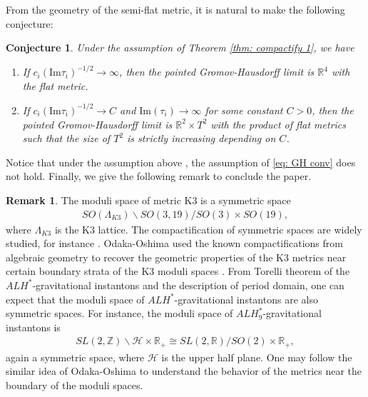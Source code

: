 \documentclass[11pt]{amsart}
\theoremstyle{plain}
\newtheorem{cor}[thm]{Corollary}
\newtheorem{conj}[thm]{Conjecture}
\theoremstyle{definition}
\newtheorem{rk}[thm]{Remark}
\numberwithin{equation}{section}
\begin{document}
From the geometry of the semi-flat metric, it is natural to make the following conjecture:
\begin{conj}
	Under the assumption of Theorem \ref{thm: compactify 1}, we have 
	\begin{enumerate}
		\item If $c_i(\mbox{Im}\tau_i)^{-1/2}\rightarrow \infty$, then the pointed Gromov-Hausdorff limit is $\mathbb{R}^4$ with the flat metric. 
	\item If $c_i(\mbox{Im}\tau_i)^{-1/2}\rightarrow C$ and $\mbox{Im}(\tau_i)\rightarrow \infty$ for some constant $C>0$, then the pointed Gromov-Hausdorff limit is $\mathbb{R}^2\times T^2$ with the product of flat metrics such that the size of $T^2$ is strictly increasing depending on $C$.
	\end{enumerate}
\end{conj} Notice that under the assumption above , the assumption of \eqref{eq: GH conv} does not hold. Finally, we give the following remark to conclude the paper. 
\begin{rk}
	The moduli space of metric K3 is a symmetric space 
	\begin{align*}
			SO(\Lambda_{K3})\backslash SO(3,19)/SO(3)\times SO(19),
		\end{align*} where $\Lambda_{K3}$ is the K3 lattice. The compactification of symmetric spaces are widely studied, for instance \cite{BJ}. Odaka-Oshima used the known compactifications from algebraic geometry to recover the geometric properties of the K3 metrics near certain boundary strata of the K3 moduli spaces \cite{OO}. From Torelli theorem of the $ALH^*$-gravitational instantons and the description of period domain, one can expect that the moduli space of $ALH^*$-gravitational instantons are also symmetric spaces. For instance, the moduli space of $ALH^*_9$-gravitational instantons is 
	\begin{align*}
			SL(2,\mathbb{Z})\backslash \mathcal{H}\times \mathbb{R}_+\cong SL(2,\mathbb{R})/SO(2)\times \mathbb{R}_+,   
	\end{align*} again a  symmetric space, where $\mathcal{H}$ is the upper half plane. One may follow the similar idea of Odaka-Oshima to understand the behavior of the metrics near the boundary of the moduli spaces. 

	
\end{rk}	
\end{document}
